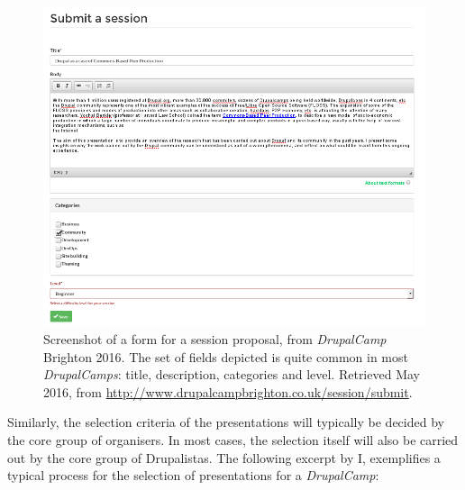 \begin{figure}[H]
\centering
\includegraphics[scale=0.5]{img/offline/call_for_sessions_dcampbrighton}
\caption[Screenshot of the form for a session proposal in \textit{DrupalCamp} Brighton 2016]%
{Screenshot of a form for a session proposal, from \textit{DrupalCamp} Brighton 2016. The set of fields depicted is quite common in most \textit{DrupalCamps}: title, description, categories and level. Retrieved  May 2016, from \url{http://www.drupalcampbrighton.co.uk/session/submit}.}
\label{dcamp-submission-form}
\end{figure}

Similarly, the selection criteria of the presentations will typically be decided by the core group of organisers. In most cases, the selection itself will also be carried out by the core group of Drupalistas. The following excerpt by I, exemplifies a typical process for the selection of presentations for a \textit{DrupalCamp}:

